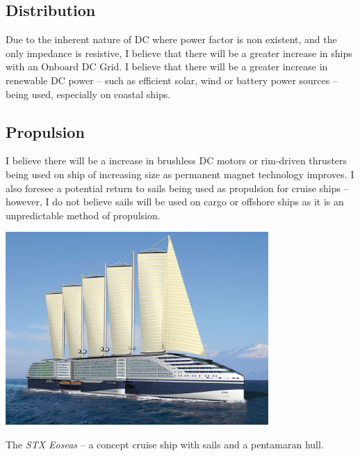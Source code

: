 \documentclass[11pt,a4paper]{article}
\begin{document}
\subsection*{Distribution}
Due to the inherent nature of DC where power factor is non existent, and the only impedance is resistive, I believe that there will be a greater increase in ships with an Onboard DC Grid. I believe that there will be a greater increase in renewable DC power -- such as efficient solar, wind or battery power sources -- being used, especially on coastal ships.
\subsection*{Propulsion}
I believe there will be a increase in brushless DC motors or rim-driven thrusters being used on ship of increasing size as permanent magnet technology improves. I also foresee a potential return to sails being used as propulsion for cruise ships -- however, I do not believe sails will be used on cargo or offshore ships as it is an unpredictable method of propulsion.
\begin{center}
\includegraphics[width=10cm]{stx}\par
The \textit{STX Eoseas} -- a concept cruise ship with sails and a pentamaran hull.
\end{center}
\end{document}
